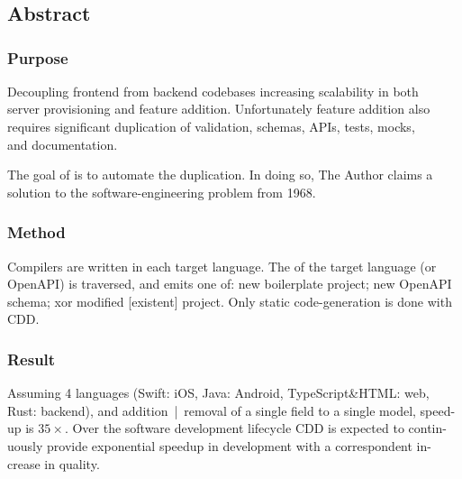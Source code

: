 \chapter[CDD]{}\label{chap:01}


\setcounter{section}{-1}
\section{Abstract}

\subsection{Purpose}
Decoupling frontend from backend codebases increasing scalability in both\\server provisioning and feature addition. Unfortunately feature addition also\\requires significant duplication of validation, schemas, APIs, tests, mocks,\\and documentation.

The goal of  is to automate the duplication. In doing so, The Author claims a solution to the software-engineering problem from 1968.

\subsection{Method}
Compilers are written in each target language. The  of the target language (or OpenAPI) is traversed, and emits one of: new boilerplate project; new OpenAPI schema; xor modified [existent] project. Only static code-generation is done with CDD.

\subsection{Result}
Assuming 4 languages (Swift: iOS, Java: Android, TypeScript\&HTML: web, Rust: backend), and addition~|~removal of a single field to a single model, speed-\\up is \(35\times\). Over the software development lifecycle CDD is expected to contin-\\uously provide exponential speedup in development with a correspondent in-\\crease in quality.

